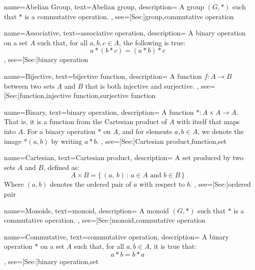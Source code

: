 {
    name={Abelian Group},
    text={Abelian group},
    description={
        A group $(G,*)$ such that $*$ is a commutative operation.
    },
    see=[See:]{group,commutative operation}
}

{
    name={Associative},
    text={associative operation},
    description={
        A binary operation on a set $A$ such that, for all $a,b,c\in{A}$,
        the following is true:
        \begin{equation*}
            a*(b*c)=(a*b)*c
        \end{equation*}
    },
    see=[See:]{binary operation}
}

{
    name={Bijective},
    text={bijective function},
    description={
        A function $f:A\rightarrow{B}$ between two sets $A$ and $B$ that
        is both injective and surjective.
    },
    see=[See:]{function,injective function,surjective function}
}

{
    name={Binary},
    text={binary operation},
    description={
        A function $*:A\times{A}\rightarrow{A}$. That is, it is a function
        from the Cartesian product of $A$ with itself that maps into $A$.
        For a binary operation $*$ on $A$, and for elements $a,b\in{A}$,
        we denote the image $*(a,b)$ by writing $a*b$.
    },
    see=[See:]{Cartesian product,function,set}
}

{
    name={Cartesian},
    text={Cartesian product},
    description={
        A set produced by two sets $A$ and $B$, defined as:
        \begin{equation*}
            A\times{B}=\{\,(a,\,b)\,:\,a\in{A}\textrm{ and }b\in{B}\,\}
        \end{equation*}
        Where $(a,b)$ denotes the ordered pair of $a$ with respect to $b$.
    },
    see=[See:]{ordered pair}
}

{
    name={Monoids},
    text={monoid},
    description={
        A monoid $(G,*)$ such that $*$ is a commutative operation.
    },
    see=[See:]{monoid,commutative operation}
}

{
    name={Commutative},
    text={commutative operation},
    description={
        A binary operation $*$ on a set $A$ such that, for all $a,b\in{A}$,
        it is true that:
        \begin{equation}
            a*b=b*a
        \end{equation}
    },
    see=[See:]{binary operation,set}
}

